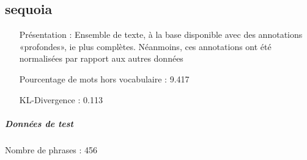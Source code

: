 \clearpage \subsection{sequoia } 
 \begin{itemize} 
 \item[Présentation :] Ensemble de texte, à la base disponible avec des annotations «profondes», ie plus complètes. Néanmoins, ces annotations ont été normalisées par rapport aux autres données

 \item[Pourcentage de mots hors vocabulaire : ]9.417
 \item[KL-Divergence :]0.113
 \end{itemize}  \subparagraph{Données de test \\ }  
 Nombre de phrases : 456\\ 
